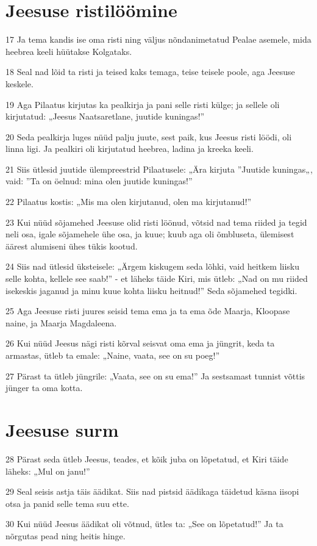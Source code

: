 \section*{Jeesuse ristilöömine}

\par 17 Ja tema kandis ise oma risti ning väljus nõndanimetatud Pealae asemele, mida heebrea keeli hüütakse Kolgataks.
\par 18 Seal nad lõid ta risti ja teised kaks temaga, teise teisele poole, aga Jeesuse keskele.
\par 19 Aga Pilaatus kirjutas ka pealkirja ja pani selle risti külge; ja sellele oli kirjutatud: „Jeesus Naatsaretlane, juutide kuningas!”
\par 20 Seda pealkirja luges nüüd palju juute, sest paik, kus Jeesus risti löödi, oli linna ligi. Ja pealkiri oli kirjutatud heebrea, ladina ja kreeka keeli.
\par 21 Siis ütlesid juutide ülempreestrid Pilaatusele: „Ära kirjuta ”Juutide kuningas„, vaid: ”Ta on öelnud: mina olen juutide kuningas!”
\par 22 Pilaatus kostis: „Mis ma olen kirjutanud, olen ma kirjutanud!”
\par 23 Kui nüüd sõjamehed Jeesuse olid risti löönud, võtsid nad tema riided ja tegid neli osa, igale sõjamehele ühe osa, ja kuue; kuub aga oli õmbluseta, ülemisest äärest alumiseni ühes tükis kootud.
\par 24 Siis nad ütlesid üksteisele: „Ärgem kiskugem seda lõhki, vaid heitkem liisku selle kohta, kellele see saab!” - et läheks täide Kiri, mis ütleb: „Nad on mu riided isekeskis jaganud ja minu kuue kohta liisku heitnud!” Seda sõjamehed tegidki.
\par 25 Aga Jeesuse risti juures seisid tema ema ja ta ema õde Maarja, Kloopase naine, ja Maarja Magdaleena.
\par 26 Kui nüüd Jeesus nägi risti kõrval seisvat oma ema ja jüngrit, keda ta armastas, ütleb ta emale: „Naine, vaata, see on su poeg!”
\par 27 Pärast ta ütleb jüngrile: „Vaata, see on su ema!” Ja sestsamast tunnist võttis jünger ta oma kotta.

\section*{Jeesuse surm}

\par 28 Pärast seda ütleb Jeesus, teades, et kõik juba on lõpetatud, et Kiri täide läheks: „Mul on janu!”
\par 29 Seal seisis astja täis äädikat. Siis nad pistsid äädikaga täidetud käsna iisopi otsa ja panid selle tema suu ette.
\par 30 Kui nüüd Jeesus äädikat oli võtnud, ütles ta: „See on lõpetatud!” Ja ta nõrgutas pead ning heitis hinge.

